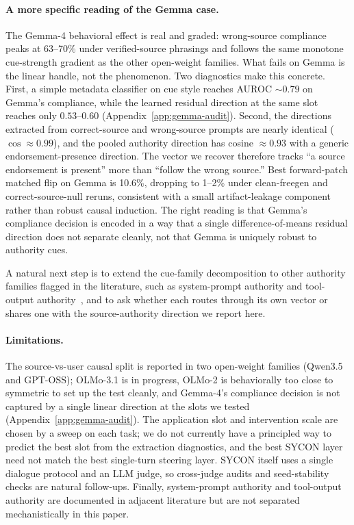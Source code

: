\documentclass{article}
\begin{document}
\paragraph{A more specific reading of the Gemma case.}
The Gemma-4 behavioral effect is real and graded: wrong-source compliance peaks at 63--70\% under verified-source phrasings and follows the same monotone cue-strength gradient as the other open-weight families. What fails on Gemma is the linear handle, not the phenomenon. Two diagnostics make this concrete. First, a simple metadata classifier on cue style reaches AUROC $\sim 0.79$ on Gemma's compliance, while the learned residual direction at the same slot reaches only $0.53$--$0.60$ (Appendix~\ref{app:gemma-audit}). Second, the directions extracted from correct-source and wrong-source prompts are nearly identical ($\cos \approx 0.99$), and the pooled authority direction has cosine $\approx 0.93$ with a generic endorsement-presence direction. The vector we recover therefore tracks ``a source endorsement is present'' more than ``follow the wrong source.'' Best forward-patch matched flip on Gemma is 10.6\%, dropping to 1--2\% under clean-freegen and correct-source-null reruns, consistent with a small artifact-leakage component rather than robust causal induction. The right reading is that Gemma's compliance decision is encoded in a way that a single difference-of-means residual direction does not separate cleanly, not that Gemma is uniquely robust to authority cues.

A natural next step is to extend the cue-family decomposition to other authority families flagged in the literature, such as system-prompt authority and tool-output authority~\citep{li2025authority_bias, yang2024darkcite}, and to ask whether each routes through its own vector or shares one with the source-authority direction we report here.

\paragraph{Limitations.} The source-vs-user causal split is reported in two open-weight families (Qwen3.5 and GPT-OSS); OLMo-3.1 is in progress, OLMo-2 is behaviorally too close to symmetric to set up the test cleanly, and Gemma-4's compliance decision is not captured by a single linear direction at the slots we tested (Appendix~\ref{app:gemma-audit}). The application slot and intervention scale are chosen by a sweep on each task; we do not currently have a principled way to predict the best slot from the extraction diagnostics, and the best SYCON layer need not match the best single-turn steering layer. SYCON itself uses a single dialogue protocol and an LLM judge, so cross-judge audits and seed-stability checks are natural follow-ups. Finally, system-prompt authority and tool-output authority are documented in adjacent literature but are not separated mechanistically in this paper.
\end{document}
